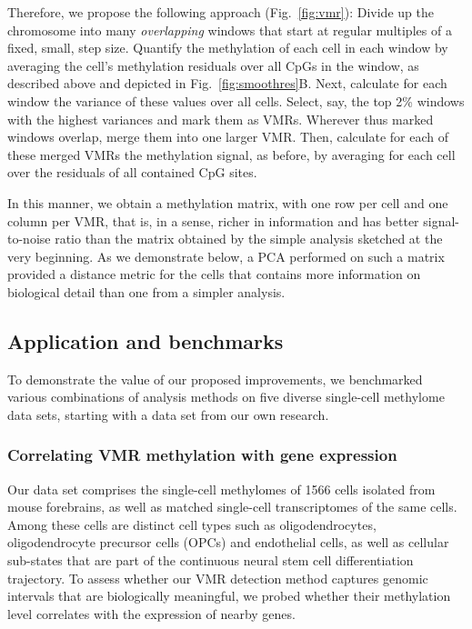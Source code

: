 \documentclass[10pt]{article}
\begin{document}
Therefore, we propose the following approach (Fig.~\ref{fig:vmr}):
Divide up the chromosome into many \emph{overlapping} windows that start at regular multiples of a fixed, small, step size.
Quantify the methylation of each cell in each window by averaging the cell's methylation residuals over all CpGs in the window, as described above and depicted in Fig.~\ref{fig:smoothres}B.
Next, calculate for each window the variance of these values over all cells.
Select, say, the top 2\% windows with the highest variances and mark them as VMRs.
Wherever thus marked windows overlap, merge them into one larger VMR.
Then, calculate for each of these merged VMRs the methylation signal, as before, by averaging for each cell over the residuals of all contained CpG sites.

In this manner, we obtain a methylation matrix, with one row per cell and one column per VMR, that is, in a sense, richer in information and has better signal-to-noise ratio than the matrix obtained by the simple analysis sketched at the very beginning.
As we demonstrate below, a PCA performed on such a matrix provided a distance metric for the cells that contains more information on biological detail than one from a simpler analysis.



\subsection*{Application and benchmarks}

To demonstrate the value of our proposed improvements, we benchmarked various combinations of analysis methods on five diverse single-cell methylome data sets, starting with a data set from our own research.

\subsubsection*{Correlating VMR methylation with gene expression}

Our data set \citep{kremer_scnmt} comprises the single-cell methylomes of 1566 cells isolated from mouse forebrains, as well as matched single-cell transcriptomes of the same cells.
Among these cells are distinct cell types such as oligodendrocytes, oligodendrocyte precursor cells (OPCs) and endothelial cells, as well as cellular sub-states that are part of the continuous neural stem cell differentiation trajectory.
To assess whether our VMR detection method captures genomic intervals that are biologically meaningful, we probed whether their methylation level correlates with the expression of nearby genes.
\end{document}
